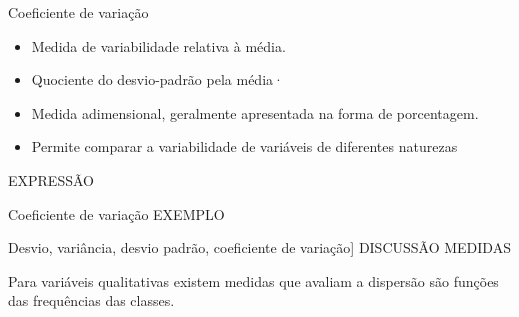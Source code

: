 \documentclass[
  ignorenonframetext,
  serif,
  professionalfont,
  usenames,
  dvipsnames,
  aspectratio = 169]{beamer}
\providecommand{\tightlist}{%
  \setlength{\itemsep}{0pt}\setlength{\parskip}{0pt}}
\renewcommand{\tightlist}{%
  \setlength{\itemsep}{0\baselineskip}
  \setlength{\parskip}{0.25\baselineskip}
}
\begin{document}
\begin{frame}{Coeficiente de variação}
\protect\hypertarget{coeficiente-de-variauxe7uxe3o}{}
\begin{itemize}
\tightlist
\item
  Medida de variabilidade relativa à média.
\item
  Quociente do desvio-padrão pela média·
\item
  Medida adimensional, geralmente apresentada na forma de porcentagem.
\item
  Permite comparar a variabilidade de variáveis de diferentes naturezas
\end{itemize}

EXPRESSÃO
\end{frame}

\begin{frame}{Coeficiente de variação}
\protect\hypertarget{coeficiente-de-variauxe7uxe3o-1}{}
EXEMPLO
\end{frame}

\begin{frame}{Desvio, variância, desvio padrão, coeficiente de
variação{]}}
\protect\hypertarget{desvio-variuxe2ncia-desvio-padruxe3o-coeficiente-de-variauxe7uxe3o}{}
DISCUSSÃO MEDIDAS

Para variáveis qualitativas existem medidas que avaliam a dispersão são
funções das frequências das classes.
\end{frame}
\end{document}
